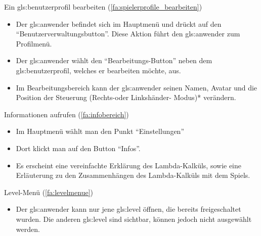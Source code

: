 \documentclass{scrartcl}
\begin{document}
\begin{telist}
	\item Ein \gls{gls:benutzerprofil} bearbeiten (\ref{fa:spielerprofile_bearbeiten}) \label{test:profilBeartbeiten}
	\begin{itemize}
		\item Der \gls{gls:anwender} befindet sich im Hauptmenü und drückt auf den \enquote{Benutzerverwaltungsbutton}. Diese Aktion führt den \gls{gls:anwender} zum Profilmenü.
		\item Der \gls{gls:anwender} wählt den \enquote{Bearbeitungs-Button} neben dem \gls{gls:benutzerprofil}, welches er bearbeiten möchte, aus.
		\item Im Bearbeitungsbereich kann der \gls{gls:anwender} seinen Namen, Avatar und die Position der Steuerung (Rechts-oder Linkshänder- Modus)*  verändern.
	\end{itemize}
	
	\item{Informationen aufrufen} \label{szenarien:infomartionen_aufrufen} (\ref{fa:infobereich})
	\begin{itemize}
		\item Im Hauptmenü wählt man den Punkt \enquote{Einstellungen}
		\item Dort klickt man auf den Button \enquote{Infos}.
		\item Es erscheint eine vereinfachte Erklärung des Lambda-Kalküls, sowie eine Erläuterung zu den Zusammenhängen des Lambda-Kalküls mit dem Spiels.
	\end{itemize}
	
	\item Level-Menü (\ref{fa:levelmenue})
	\begin{itemize}
		\item Der \gls{gls:anwender} kann nur jene \gls{gls:level} öffnen, die bereits freigeschaltet wurden. Die anderen \gls{gls:level} sind sichtbar, können jedoch nicht ausgewählt werden.
	\end{itemize}
	

\end{telist}
\end{document}
